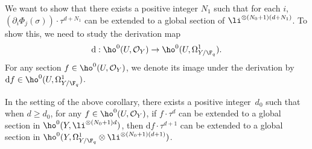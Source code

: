 We want to show that there exists a positive integer $N_1$ such that for each $i$, $\left(\partial_i \Phi_j(\sigma) \right)\cdot \tau^{d+N_1}$ can be extended to a global section of $\li^{\otimes (N_0+1)(d+N_1)}$. To show this, we need to study the derivation map\vspace*{-3pt}
\[
\mathrm{d}: \ho^0(U, \mathcal{O}_Y)\to \ho^0(U, \Omega_{Y/\F_q}^1).
\]
For any section $f\in \ho^0(U, \mathcal{O}_Y)$, we denote its image under the derivation by $\mathrm{d}f\in \ho^0(U, \Omega_{Y/\F_q}^1)$.
\begin{lem}\label{preextend}
In the setting of the above corollary, there exists a positive integer~$d_0$ such that when $d\geq d_0$, for any $f\in \ho^0(U, \mathcal{O}_Y)$, if $f\cdot \tau^d$ can be extended to a global section in $ \ho^0(Y, \li^{\otimes (N_0+1)d})$, then $\mathrm{d} f\cdot \tau^{d+1}$ can be extended to a global section in $\ho^0(Y, \Omega_{Y/\F_q}^1\otimes \li^{\otimes (N_0+1)(d+1)})$.
\end{lem}
